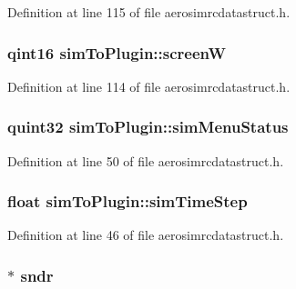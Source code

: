 \-Definition at line 115 of file aerosimrcdatastruct.\-h.

\hypertarget{group___aero_sim_r_c_ga0e82f7a599641d119734afe4a0f4403c}{
\subsubsection[{screen\-W}]{\setlength{\rightskip}{0pt plus 5cm}qint16 {\bf sim\-To\-Plugin\-::screen\-W}}}\label{group___aero_sim_r_c_ga0e82f7a599641d119734afe4a0f4403c}


\-Definition at line 114 of file aerosimrcdatastruct.\-h.

\hypertarget{group___aero_sim_r_c_ga1cc3af651b3f3382357e9a882abc64d4}{
\subsubsection[{sim\-Menu\-Status}]{\setlength{\rightskip}{0pt plus 5cm}quint32 {\bf sim\-To\-Plugin\-::sim\-Menu\-Status}}}\label{group___aero_sim_r_c_ga1cc3af651b3f3382357e9a882abc64d4}


\-Definition at line 50 of file aerosimrcdatastruct.\-h.

\hypertarget{group___aero_sim_r_c_ga58a610591c7eb9b7e1f32208e4cb343c}{
\subsubsection[{sim\-Time\-Step}]{\setlength{\rightskip}{0pt plus 5cm}float {\bf sim\-To\-Plugin\-::sim\-Time\-Step}}}\label{group___aero_sim_r_c_ga58a610591c7eb9b7e1f32208e4cb343c}


\-Definition at line 46 of file aerosimrcdatastruct.\-h.

\hypertarget{group___aero_sim_r_c_ga74a874f84e60aa753bdb56cd47d55d8b}{
\subsubsection[{sndr}]{$\ast$ {\bf sndr}}}\label{group___aero_sim_r_c_ga74a874f84e60aa753bdb56cd47d55d8b}


